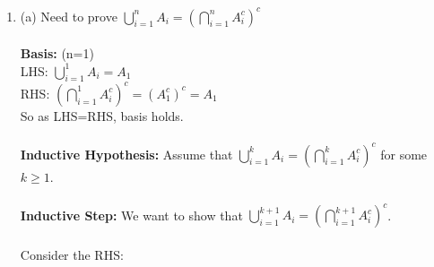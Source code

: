 \documentclass[a4paper]{article}
\begin{document}
\begin{enumerate}
    \item (a) Need to prove $\bigcup_{i=1}^{n} A_i = \left(\bigcap_{i=1}^{n} A_i^c\right)^c$\\
    \\
    \textbf{Basis:} (n=1)\\
    LHS: $\bigcup_{i=1}^{1} A_i = A_1$\\
    RHS: $\left(\bigcap_{i=1}^{1} A_i^c\right)^c = (A_1^c)^c = A_1$\\
    So as LHS=RHS, basis holds.\\
    \\
    \textbf{Inductive Hypothesis:} Assume that $\bigcup_{i=1}^{k} A_i = \left(\bigcap_{i=1}^{k} A_i^c\right)^c$ for some $k \geq 1$.\\
    \\
    \textbf{Inductive Step:} We want to show that $\bigcup_{i=1}^{k+1} A_i = \left(\bigcap_{i=1}^{k+1} A_i^c\right)^c$.\\
    \\
    Consider the RHS:


\end{enumerate}
\end{document}
